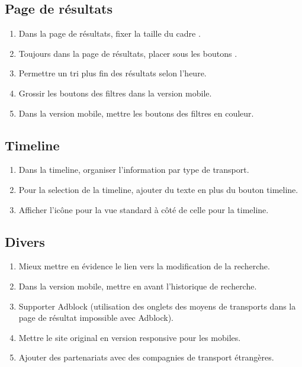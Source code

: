 \subsection{Page de r\'{e}sultats}
\begin{enumerate}
\item Dans la page de r\'{e}sultats, fixer la taille du cadre .
\item Toujours dans la page de r\'{e}sultats, placer  sous les boutons .
\item Permettre un tri plus fin des r\'{e}sultats selon l'heure.
\item Grossir les boutons des filtres dans la version mobile.
\item Dans la version mobile, mettre les boutons des filtres en couleur.
\end{enumerate}

\subsection{Timeline}
\begin{enumerate}
\item Dans la timeline, organiser l'information par type de transport.
\item Pour la selection de la timeline, ajouter du texte en plus du bouton timeline.
\item Afficher l'ic\^{o}ne pour la vue standard \`{a} c\^{o}t\'{e} de celle pour la timeline.
\end{enumerate}

\subsection{Divers}
\begin{enumerate}
\item Mieux mettre en \'{e}vidence le lien vers la modification de la recherche.
\item Dans la version mobile, mettre en avant l'historique de recherche.
\item Supporter Adblock (utilisation des onglets des moyens de transports dans la page de r\'{e}sultat impossible avec Adblock).
\item Mettre le site original en version responsive pour les mobiles.
\item Ajouter des partenariats avec des compagnies de transport \'{e}trang\`{e}res.
\end{enumerate}
